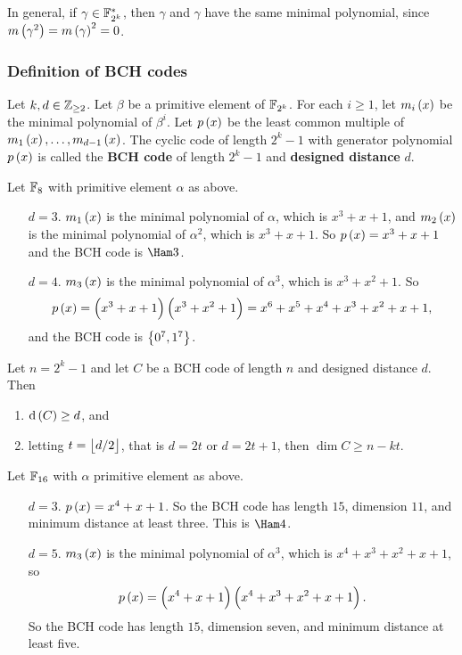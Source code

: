 \begin{note*}
In general, if $ \gamma \in \mathbb{F}_{2^k}^* $, then $ \gamma $ and $ \gamma $ have the same minimal polynomial, since $ m\br{\gamma^2} = m\br{\gamma}^2 = 0 $.
\end{note*}

\subsubsection{Definition of BCH codes}

Let $ k, d \in \mathbb{Z}_{\ge 2} $. Let $ \beta $ be a primitive element of $ \mathbb{F}_{2^k} $. For each $ i \ge 1 $, let $ m_i\br{x} $ be the minimal polynomial of $ \beta^i $. Let $ p\br{x} $ be the least common multiple of $ m_1\br{x}, \dots, m_{d - 1}\br{x} $. The cyclic code of length $ 2^k - 1 $ with generator polynomial $ p\br{x} $ is called the \textbf{BCH code} of length $ 2^k - 1 $ and \textbf{designed distance} $ d $.

\begin{example*}
Let $ \mathbb{F}_8 $ with primitive element $ \alpha $ as above.
\begin{itemize}[leftmargin=0.5in]
\item[$ d = 3 $.] $ m_1\br{x} $ is the minimal polynomial of $ \alpha $, which is $ x^3 + x + 1 $, and $ m_2\br{x} $ is the minimal polynomial of $ \alpha^2 $, which is $ x^3 + x + 1 $. So $ p\br{x} = x^3 + x + 1 $ and the BCH code is $ \Ham 3 $.
\item[$ d = 4 $.] $ m_3\br{x} $ is the minimal polynomial of $ \alpha^3 $, which is $ x^3 + x^2 + 1 $. So
$$ p\br{x} = \br{x^3 + x + 1}\br{x^3 + x^2 + 1} = x^6 + x^5 + x^4 + x^3 + x^2 + x + 1, $$
and the BCH code is $ \cbr{0^7, 1^7} $.
\end{itemize}
\end{example*}

\pagebreak

\begin{theorem}
\label{thm:1.32}
Let $ n = 2^k - 1 $ and let $ C $ be a BCH code of length $ n $ and designed distance $ d $. Then
\begin{enumerate}
\item $ \d\br{C} \ge d $, and
\item letting $ t = \left\lfloor d / 2 \right\rfloor $, that is $ d = 2t $ or $ d = 2t + 1 $, then $ \dim C \ge n - kt $.
\end{enumerate}
\end{theorem}

\begin{example*}
Let $ \mathbb{F}_{16} $ with $ \alpha $ primitive element as above.
\begin{itemize}[leftmargin=0.5in]
\item[$ d = 3 $.] $ p\br{x} = x^4 + x + 1 $. So the BCH code has length $ 15 $, dimension $ 11 $, and minimum distance at least three. This is $ \Ham 4 $.
\item[$ d = 5 $.] $ m_3\br{x} $ is the minimal polynomial of $ \alpha^3 $, which is $ x^4 + x^3 + x^2 + x + 1 $, so
$$ p\br{x} = \br{x^4 + x + 1}\br{x^4 + x^3 + x^2 + x + 1}. $$
So the BCH code has length $ 15 $, dimension seven, and minimum distance at least five.
\end{itemize}
\end{example*}

